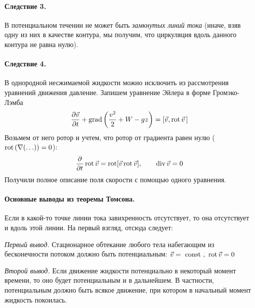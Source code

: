 \paragraph{Следствие 3.} В потенциальном течении не может быть \textit{замкнутых линий тока} (иначе, взяв одну из них в качестве контура, мы получим, что циркуляция вдоль данного контура не равна нулю).

\paragraph{Следствие 4.} В однородной несжимаемой жидкости можно исключить из рассмотрения уравнений движения давление.  Запишем уравнение Эйлера в форме Громэко-Лэмба
\begin{equation}
	\frac { \partial \vec{v} } { \partial t } +\operatorname{grad} \left( \frac { v ^ { 2 } } { 2 } + W - g z \right) = [ \vec{v} , \operatorname{rot} \vec{v}\,]
\end{equation}
Возьмем от него ротор и учтем, что ротор от градиента равен нулю ($\operatorname{rot}\qty(\nabla \qty(\ldots))= 0 $):
\begin{align*}
{ \pdv{t} \operatorname{rot}\vec{v} = \operatorname{rot}[ \vec{v} \operatorname{rot}\vec{v} ] }, \qquad
{\operatorname{div}\vec{v} = 0 }
\end{align*}
Получили полное описание поля скорости с помощью одного уравнения.


\paragraph{Основные выводы из теоремы Томсона.} Если в какой-то точке линии тока завихренность отсутствует, то она отсутствует и вдоль этой линии. На первый взгляд, отсюда следует:

\vspace{0.5em}
\textit{Первый вывод.} Стационарное обтекание любого тела набегающим из бесконечности потоком должно быть потенциальным: $\vec{v} = \text { const }, \,\,\operatorname{rot}\vec{v} = 0$
\vspace{0.5em}

\textit{Второй вывод.} Если движение жидкости потенциально в некоторый момент времени, то оно будет потенциальным и в дальнейшем. В частности, потенциальным должно быть всякое движение, при котором в начальный момент жидкость покоилась. 
\vspace{0.5em}

